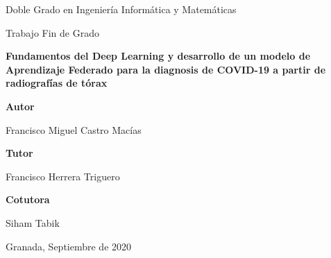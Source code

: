 \begin{titlepage}
	\singlespacing
	\begin{center}
		\vspace*{-1.5cm}
		
		\logo
		
		\vspace{0.5cm}				
		
		\Large
		Doble Grado en Ingeniería Informática y Matemáticas
		
		\vspace{0.5cm}
		
		\Large
		Trabajo Fin de Grado
		
		\vspace{1.5cm}
		\Huge
		\textbf{Fundamentos del Deep Learning y desarrollo de un modelo de Aprendizaje Federado para la diagnosis de COVID-19 a partir de radiografías de tórax}
		
		\vspace{1.5cm}
		
		\Large
		\textbf{Autor}
		
		Francisco Miguel Castro Macías
		
		\vspace{0.5cm}
		\Large
		\textbf{Tutor}
		
		Francisco Herrera Triguero
		
		\vspace{0.5cm}
		\Large
		\textbf{Cotutora}
		
		Siham Tabik
		
		\vspace{1.5cm}
		
		\Large
		Granada, Septiembre de 2020
		
	\end{center}
\end{titlepage}